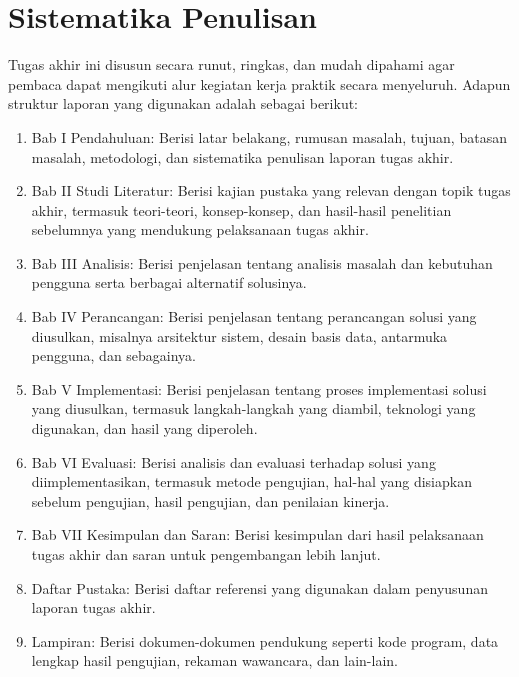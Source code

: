 \section{Sistematika Penulisan}
Tugas akhir ini disusun secara runut, ringkas, dan mudah dipahami agar pembaca dapat mengikuti alur kegiatan kerja praktik secara menyeluruh. Adapun struktur laporan yang digunakan adalah sebagai berikut: 
\begin{enumerate}
\item	Bab I Pendahuluan: Berisi latar belakang, rumusan masalah, tujuan, batasan masalah, metodologi, dan sistematika penulisan laporan tugas akhir.
\item	Bab II Studi Literatur: Berisi kajian pustaka yang relevan dengan topik tugas akhir, termasuk teori-teori, konsep-konsep, dan hasil-hasil penelitian sebelumnya yang mendukung pelaksanaan tugas akhir.
\item	Bab III Analisis: Berisi penjelasan tentang analisis masalah dan kebutuhan pengguna serta berbagai alternatif solusinya.
\item   Bab IV Perancangan: Berisi penjelasan tentang perancangan solusi yang diusulkan, misalnya arsitektur sistem, desain basis data, antarmuka pengguna, dan sebagainya.
\item	Bab V Implementasi: Berisi penjelasan tentang proses implementasi solusi yang diusulkan, termasuk langkah-langkah yang diambil, teknologi yang digunakan, dan hasil yang diperoleh.
\item	Bab VI Evaluasi: Berisi analisis dan evaluasi terhadap solusi yang diimplementasikan, termasuk metode pengujian, hal-hal yang disiapkan sebelum pengujian, hasil pengujian, dan penilaian kinerja.                  
\item   Bab VII Kesimpulan dan Saran: Berisi kesimpulan dari hasil pelaksanaan tugas akhir dan saran untuk pengembangan lebih lanjut.
\item   Daftar Pustaka: Berisi daftar referensi yang digunakan dalam penyusunan laporan tugas akhir.
\item   Lampiran: Berisi dokumen-dokumen pendukung seperti kode program, data lengkap hasil pengujian, rekaman wawancara, dan lain-lain. 
\end{enumerate}